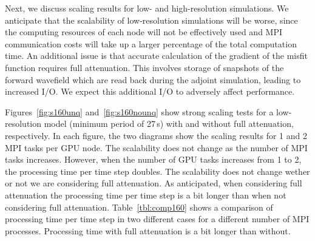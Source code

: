 


Next,
we discuss scaling results for low- and high-resolution simulations.
We anticipate that the scalability of low-resolution
simulations will be worse, since the
computing resources of each node will not be
effectively used and MPI communication costs will take up a larger percentage of
the total computation time.
An additional issue is that accurate calculation of the gradient of the misfit function requires full attenuation.
This involves storage of snapshots of the forward wavefield which are read back during the
adjoint simulation, leading to increased I/O.
We expect this additional I/O to adversely affect performance.

Figures~\ref{fig:s160unq} and~\ref{fig:s160nounq} show strong scaling tests
for a low-resolution model (minimum period of 27\,s) with
and without full attenuation, respectively. In each figure, the two
diagrams show the scaling results for 1 and 2 MPI tasks per GPU node. The
scalability does not change as the number of MPI tasks increases. However, when
the number of GPU tasks increases from 1 to 2, the processing time per time step
doubles. The scalability does not change wether or not we are considering full attenuation.  As
anticipated, when considering full attenuation the processing time per time step is a
bit longer than when not considering full attenuation. Table~\ref{tbl:comp160} shows a
comparison of processing time per time step in two different cases for a different
number of MPI processes. Processing time with full attenuation is a bit longer than without.

